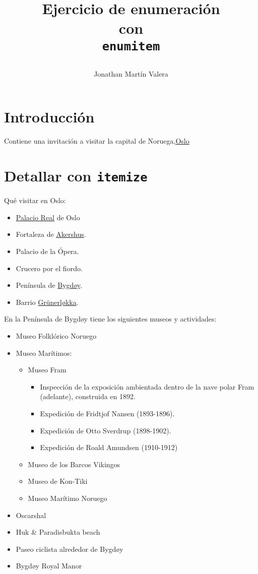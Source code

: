 \documentclass[12pt,
              ]{article}
\title
{
	\HRule
	\begin{flushright}
		\Huge
		\textbf{Ejercicio de enumeración}\\[3mm]
		\Large
		\textbf{con}\\
		\Huge
		\texttt{enumitem}
	\end{flushright}
	\HRule 
}
\author{\large Jonathan Martín Valera}
\begin{document}
	\maketitle
	
	\tableofcontents %
	
	\setcounter{section}{-1}
	
	\section{Introducción}
	
	Contiene una invitación a visitar la capital de Noruega,\href{https://www.visitoslo.com/es/}{Oslo}

	\section{Detallar con \texttt{itemize} }
	
	Qué visitar en Oslo:
	
	\begin{itemize}
		\item \href{https://is.gd/SrdzCR}{Palacio Real} de Oslo
		\item Fortaleza de \href{https://is.gd/IKUxmO}{Akershus}.
		\item Palacio de la Ópera.
		\item Crucero por el fiordo.
		\item Península de \href{https://is.gd/HABCLE}{Bygdøy}.
		\item Barrio \href{https://is.gd/Wro3WO}{Grünerløkka}.
	\end{itemize}

	En la Península de Bygdøy tiene los siguientes museos y actividades:
	
	\begin{itemize}
		\item Museo Folklórico Noruego
		\item Museo Marítimos:
		\begin{itemize}
			 \item Museo Fram
			 \begin{itemize}
				\item Inspección de la exposición ambientada dentro de la nave polar Fram
				(adelante), construida en 1892.
				\item Expedición de Fridtjof Nansen (1893-1896).
				\item Expedición de Otto Sverdrup (1898-1902).
				\item Expedición de Roald Amundsen (1910-1912)
			\end{itemize}
	 	\item Museo de los Barcos Vikingos
		\item Museo de Kon-Tiki
		\item Museo Marítimo Noruego
	\end{itemize}
	\item Oscarshal
	\item Huk \& Paradisbukta beach
	\item Paseo ciclista alrededor de Bygdøy
	\item Bygdøy Royal Manor
	\end{itemize}
\end{document}
